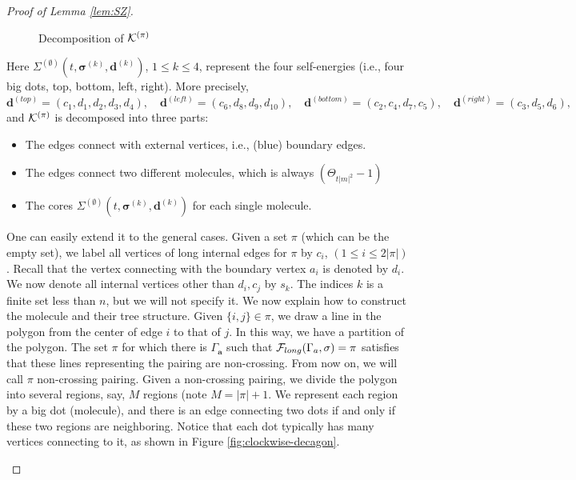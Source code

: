 \documentclass[10pt,reqno]{article}
\theoremstyle{plain} %
\theoremstyle{remark}
\numberwithin{equation}{section}
\begin{document}
\begin{proof}[ Proof of Lemma  \ref{lem:SZ}]
\begin{figure}[ht]
    \caption{Decomposition of $\cal K^{(\pi)}$}
    \label{fig:Decp}
\end{figure}
Here  ${\Sigma}^{(\emptyset)}(t, \boldsymbol{\sigma}^{(k)}, \textbf{d}^{(k)})$, $1\le k\le 4$, 
represent the four self-energies   (i.e., four big dots, top, bottom, left, right). More precisely,  
$$
\textbf{d}^{(top)}=(c_1,d_1,d_2,d_3,d_4),\quad
\textbf{d}^{(left)}=(c_6,d_8,d_9,d_{10}),\quad
\textbf{d}^{(bottom)}=(c_2,c_4,d_7,c_5),\quad
\textbf{d}^{(right)}=(c_3,d_5,d_6),\quad
$$
and   $\cal K^{(\pi)}$ is decomposed  into three parts: 
\begin{itemize}
    \item The edges connect with external vertices, i.e., (blue) boundary edges.  
    \item The edges connect two different molecules, which is always $\left(\Theta_{{t|m|^2}}-1\right)$
    \item The cores ${\Sigma}^{(\emptyset)}(t, \boldsymbol{\sigma}^{(k)}, \textbf{d}^{(k)})$ for each single molecule. 
\end{itemize}






One can easily extend it to the general cases. Given a set 
$\pi$ (which can be the empty set), we label all vertices of long internal edges for $\pi$ by $c_i$, $(1\le i\le 2|\pi|)$. Recall that the vertex connecting with the 
boundary vertex $a_i$ is denoted by  $d_i$. We now denote all internal vertices other than $d_i, c_j$ by $s_k$. 
The indices $k$ is a finite set less than $n$, but we will not specify it. 
We now explain how to construct the molecule and their tree structure. Given $ \{i, j \} \in \pi$, we draw a line in the polygon from the center of edge $i$ to 
that of $j$.  In this way, we have a partition of the polygon. The set $\pi$ for which there is $\Gamma_{\textbf{a}}$ such that $ {\cal F}_{long}(\Gamma_{\textbf{a}}, \sigma)=\pi $ satisfies that these lines representing the pairing are non-crossing. From now on, we will call  $\pi$ non-crossing pairing. 
Given a non-crossing pairing, we divide the polygon into several regions, say, $M$ regions (note $M=|\pi|+1$. We represent each region by a big dot (molecule), and there is an edge connecting two dots if and only if these two regions are neighboring.    Notice that each dot typically has many vertices connecting to it, as shown in Figure \ref{fig:clockwise-decagon}. 
\usetikzlibrary{calc}
\begin{figure}[ht]
    \centering 
  \begin{tikzpicture}[scale=0.8]


\end{tikzpicture}
\end{figure}
\end{proof}
\end{document}
